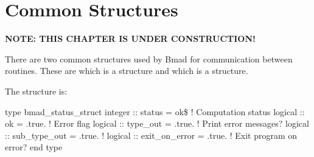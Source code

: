 \section{Common Structures}
\label{s:common.struct}


{\bf NOTE: THIS CHAPTER IS UNDER CONSTRUCTION!}

There are two common structures used by Bmad for communication between
routines. These are  which is a 
structure and  which is a 
structure.


The  structure is:
\begin{example}
type bmad_status_struct
  integer :: status         = ok\$     ! Computation status 
  logical :: ok             = .true.   ! Error flag
  logical :: type_out       = .true.   ! Print error messages?
  logical :: sub_type_out   = .true.   ! 
  logical :: exit_on_error  = .true.   ! Exit program on error?
end type
\end{example}




